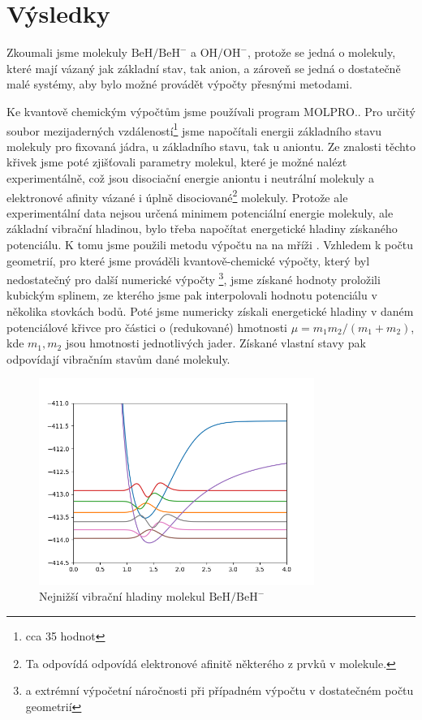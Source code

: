 \chapter{Výsledky}
Zkoumali jsme molekuly $\mathrm{BeH/BeH^-}$ a $\mathrm{OH/OH^-}$, protože se jedná o 
molekuly, které mají vázaný jak základní stav, tak anion, a zároveň se jedná o 
dostatečně malé systémy, aby bylo možné provádět výpočty přesnými metodami.

Ke kvantově chemickým výpočtům jsme používali program MOLPRO.\cite{MOLPRO-WIREs}\cite{MOLPRO}. 
Pro určitý soubor mezijaderných vzdáleností\footnote{cca 35 hodnot} jsme napočítali 
energii základního stavu molekuly pro fixovaná jádra, u základního stavu, tak u 
aniontu. Ze znalosti těchto křivek jsme poté zjišťovali parametry molekul, které je 
možné nalézt experimentálně, což jsou disociační energie aniontu i neutrální molekuly a 
elektronové afinity vázané i úplně disociované\footnote{Ta odpovídá odpovídá 
elektronové afinitě některého z prvků v molekule.} molekuly. Protože ale experimentální 
data nejsou určená minimem potenciální energie molekuly, ale základní vibrační 
hladinou, bylo třeba napočítat energetické hladiny získaného potenciálu. K tomu jsme 
použili \? metodu výpočtu na na mříži \? . Vzhledem k počtu geometrií, pro které jsme 
prováděli kvantově-chemické výpočty, který byl nedostatečný pro další numerické výpočty
\footnote{a extrémní výpočetní náročnosti při případném výpočtu v dostatečném počtu 
geometrií}, jsme získané hodnoty proložili kubickým splinem, ze kterého jsme pak 
interpolovali hodnotu potenciálu v několika stovkách bodů. Poté jsme numericky získali 
energetické hladiny v daném potenciálové křivce pro částici o (redukované) hmotnosti $
\mu = m_1m_2/(m_1+m_2)$, kde $m_1,m_2$ jsou hmotnosti jednotlivých jader. Získané 
vlastní stavy pak odpovídají vibračním stavům dané molekuly.

\begin{figure}
\centering
\includegraphics[width=0.8\textwidth]{../img/VibrStavy1.png}
\caption{Nejnižší vibrační hladiny molekul $\mathrm{BeH/BeH^-}$}
\label{Vibr1}
\end{figure}




